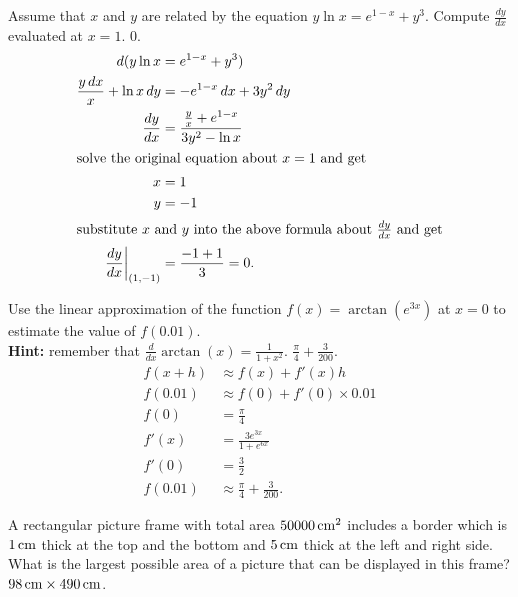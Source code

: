     {Assume that $x$ and $y$ are related by the equation $y \ln x = e^{1-x}
    + y^3$. Compute $\frac{dy}{dx}$ evaluated at $x=1$.}
    {$0$.}
    \begin{align*}
      d( y \ln x &= e^{1-x} + y^3 ) \\
      \frac{y \, dx}{x} + \ln x \, dy &= -e^{1-x} \, dx + 3y^2 \, dy \\
      \frac{dy}{dx} &= \frac{\frac{y}{x} + e^{1-x}}{3y^2 - \ln x} \\
      \intertext{solve the original equation about $x = 1$ and get}
        x &= 1 \\
        y &= -1 \\
      \intertext{substitute $x$ and $y$ into the above formula about
      $\frac{dy}{dx}$ and get}
      \left.\frac{dy}{dx}\right\rvert_{(1,-1)}
        &= \frac{-1+1}{3} = 0.
    \end{align*}
  
    {Use the linear approximation of the function $f(x) = \arctan(e^{3x})$
    at $x=0$ to estimate the value of $f(0.01)$. \\
    \textbf{Hint:} remember that $\frac{d}{dx}\arctan(x) = \frac{1}{1+x^2}$.}
    {$\frac{\pi}{4} + \frac{3}{200}$.}
    \begin{align*}
      f(x+h) &\approx f(x) + f'(x)h \\
      f(0.01) &\approx f(0) + f'(0) \times 0.01 \\
      f(0) &= \frac{\pi}{4} \\
      f'(x) &= \frac{3e^{3x}}{1+e^{6x}} \\
      f'(0) &= \frac{3}{2} \\
      f(0.01) &\approx \frac{\pi}{4} + \frac{3}{200}.
    \end{align*}
  
    {A rectangular picture frame with total area $50000 \,\mathrm{cm}^2$ includes a
    border which is $1 \,\mathrm{cm}$ thick at the top and the bottom and $5 \,\mathrm{cm}$ thick
    at the left and right side. What is the largest possible area of a picture
    that can be displayed in this frame?}
    {$98 \,\mathrm{cm} \times 490 \,\mathrm{cm}$.}
    
